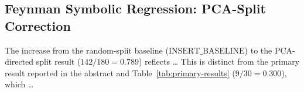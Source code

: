 %
%

\subsection{Feynman Symbolic Regression: PCA-Split Correction}
\label{sec:feynman-pca-correction}

The increase from the random-split baseline
($\mathrm{INSERT\_BASELINE}$)  %
to the PCA-directed split result ($142/180 = 0.789$) reflects
\ldots
This is distinct from the primary result reported in the abstract
and Table~\ref{tab:primary-results} ($9/30 = 0.300$), which
\ldots

